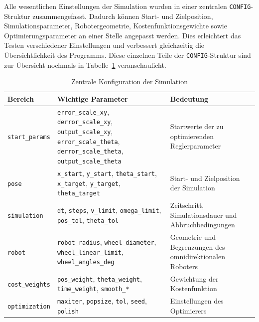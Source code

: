 Alle wesentlichen Einstellungen der Simulation wurden in einer zentralen \texttt{CONFIG}-Struktur zusammengefasst. Dadurch können Start- und Zielposition, Simulationsparameter, Robotergeometrie, Kostenfunktionsgewichte sowie Optimierungsparameter an einer Stelle angepasst werden. Dies erleichtert das Testen verschiedener Einstellungen und verbessert gleichzeitig die Übersichtlichkeit des Programms.
Diese einzelnen Teile der \texttt{CONFIG}-Struktur sind zur Übersicht nochmals in Tabelle~\ref{tab:config} veranschaulicht.

\begin{table}[H]
    \centering
    \caption{Zentrale Konfiguration der Simulation}
    \label{tab:config}
    \small
    \begin{tabularx}{\textwidth}{lXX}
        \toprule
        \textbf{Bereich} & \textbf{Wichtige Parameter} & \textbf{Bedeutung} \\
        \midrule

        \texttt{start\_params} &
        \texttt{error\_scale\_xy}, \texttt{derror\_scale\_xy},
        \texttt{output\_scale\_xy}, \texttt{error\_scale\_theta},
        \texttt{derror\_scale\_theta},
        \texttt{output\_scale\_theta} &
        Startwerte der zu optimierenden Reglerparameter \\

        \texttt{pose} &
        \texttt{x\_start}, \texttt{y\_start},
        \texttt{theta\_start},
        \texttt{x\_target}, \texttt{y\_target},
        \texttt{theta\_target} &
        Start- und Zielposition der Simulation \\

        \texttt{simulation} &
        \texttt{dt}, \texttt{steps},
        \texttt{v\_limit}, \texttt{omega\_limit},
        \texttt{pos\_tol},
        \texttt{theta\_tol} &
        Zeitschritt, Simulationsdauer und Abbruchbedingungen \\

        \texttt{robot} &
        \texttt{robot\_radius},
        \texttt{wheel\_diameter},
        \texttt{wheel\_linear\_limit},
        \texttt{wheel\_angles\_deg} &
        Geometrie und Begrenzungen des omnidirektionalen Roboters \\

        \texttt{cost\_weights} &
        \texttt{pos\_weight},
        \texttt{theta\_weight},
        \texttt{time\_weight},
        \texttt{smooth\_*} &
        Gewichtung der Kostenfunktion \\

        \texttt{optimization} &
        \texttt{maxiter},
        \texttt{popsize},
        \texttt{tol},
        \texttt{seed},
        \texttt{polish} &
        Einstellungen des Optimierers \\

        \bottomrule
    \end{tabularx}
\end{table}

